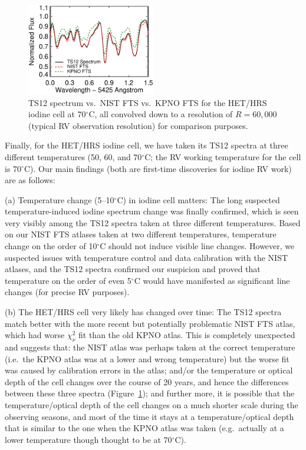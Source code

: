 \documentclass[12pt]{article}
\def\degree{^{\circ}}
\begin{document}
\begin{figure}
  \vspace{-35pt}
  \begin{center}
    \includegraphics[width=0.5\textwidth]{het70_comp}
  \end{center}
  \vspace{-25pt}  
  \caption{TS12 spectrum vs.\ NIST FTS vs.\ KPNO FTS for the HET/HRS
    iodine cell at 70$\degree$C, all convolved down to a resolution of
    $R=60,000$ (typical RV observation resolution) for comparison
    purposes.}
  \vspace{-8pt}  
  \label{fig:fts}
\end{figure}

Finally, for the HET/HRS iodine cell, we have taken its TS12 spectra
at three different temperatures (50, 60, and 70$\degree$C; the RV
working temperature for the cell is 70$\degree$C). Our main findings
(both are first-time discoveries for iodine RV work) are as follows:

(a) Temperature change (5--10$\degree$C) in iodine cell matters: The
long suspected temperature-induced iodine spectrum change was finally
confirmed, which is seen very visibly among the TS12 spectra taken at
three different temperatures. Based on our NIST FTS atlases taken at
two different temperatures, temperature change on the order of
10$\degree$C should not induce visible line changes. However, we
suspected issues with temperature control and data calibration with
the NIST atlases, and the TS12 spectra confirmed our suspicion and
proved that temperature on the order of even 5$\degree$C would have
manifested as significant line changes (for precise RV purposes).

(b) The HET/HRS cell very likely has changed over time: The TS12
spectra match better with the more recent but potentially problematic
NIST FTS atlas, which had worse $\chi^2_\nu$ fit than the old KPNO
atlas. This is completely unexpected and suggests that: the NIST atlas
was perhaps taken at the correct temperature (i.e.\ the KPNO atlas was
at a lower and wrong temperature) but the worse fit was caused by
calibration errors in the atlas; and/or the temperature or optical
depth of the cell changes over the course of 20 years, and hence the
differences between these three spectra (Figure~\ref{fig:fts}); and
further more, it is possible that the temperature/optical depth of the
cell changes on a much shorter scale during the observing seasons, and
most of the time it stays at a temperature/optical depth that is
similar to the one when the KPNO atlas was taken (e.g.\ actually at a
lower temperature though thought to be at 70$\degree$C).
\end{document}
